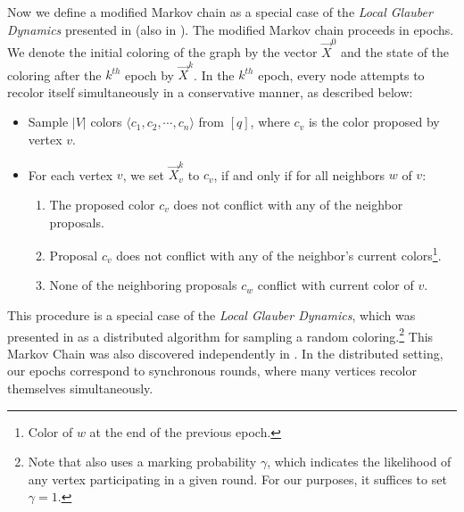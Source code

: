 Now we define a modified Markov chain as a special case of the \emph{Local Glauber Dynamics} presented in \cite{ghaffari_fischer}
(also in \cite{yitong}).
The modified Markov chain proceeds in epochs.
We denote the initial coloring of the graph by the vector $\vec X^0$ and the state of the coloring after the $k^{th}$ epoch by $\vec X^k$.
In the $k^{th}$ epoch, every node attempts to recolor itself simultaneously in a conservative manner, as described below:
\begin{itemize}
    \item Sample $|V|$ colors $ \langle c_1, c_2,\cdots, c_n \rangle$ from $[q]$, where $c_v$ is the color proposed by vertex $v$.
    \item For each vertex $v$, we set $\vec X^k_v$ to $c_v$, if and only if for all neighbors $w$ of $v$:
    \begin{enumerate}
        \item {}
        The proposed color $c_v$ does not conflict with any of the neighbor proposals.
        \item {}
        Proposal $c_v$ does not conflict with any of the neighbor's current colors\footnote{Color of $w$ at the end of the previous epoch.}.
        \item {}
        None of the neighboring proposals $c_w$ conflict with current color of $v$.
    \end{enumerate}
\end{itemize}

This procedure is a special case of the \emph{Local Glauber Dynamics},
which was presented in \cite{ghaffari_fischer} as a distributed algorithm for sampling a random coloring.\footnote{
Note that \cite{ghaffari_fischer} also uses a marking probability $\gamma$,
which indicates the likelihood of any vertex participating in a given round.
For our purposes, it suffices to set $\gamma = 1$.}
This Markov Chain was also discovered independently in \cite{yitong}.
In the distributed setting, our epochs correspond to synchronous rounds, where many vertices recolor themselves simultaneously.

